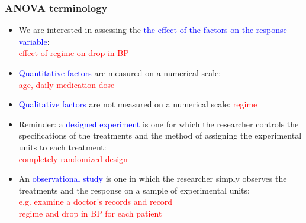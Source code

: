 \documentclass[12pt,xcolor=dvipsnames,handout,mathserif,aspectratio=169]{beamer}
\newcommand{\tc}{\textcolor}
\begin{document}
\begin{frame}\frametitle{ANOVA terminology}
\begin{itemize}
\item We are interested in assessing the \tc{blue}{the effect of the factors on the response variable}:\\
\hspace*{0.9cm}\tc{red}{effect of regime on drop in BP}
\vspace*{0.2cm}
\item \tc{blue}{Quantitative factors} are measured on a numerical scale:\\
\hspace*{0.9cm}\tc{red}{age, daily medication dose}
\vspace*{0.2cm}
\item \tc{blue}{Qualitative factors} are not measured on a numerical scale:
\hspace*{0.9cm}\tc{red}{regime}
\vspace*{0.2cm}
\item Reminder: a \tc{blue}{designed experiment} is one for which the researcher controls the specifications of the treatments and the method of assigning the experimental units to each treatment:\\
\hspace*{0.9cm}\tc{red}{completely randomized design}
\vspace*{0.2cm}
\item An \tc{blue}{observational study} is one in which the researcher simply observes the treatments and the response on a sample of experimental units:\\
\hspace*{0.9cm}\tc{red}{e.g. examine a doctor's records and record}\\
\hspace*{0.9cm}\tc{red}{regime and drop in BP for each patient}
\end{itemize}
\end{frame}
\end{document}
